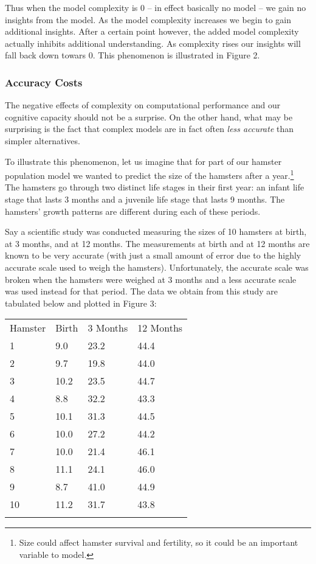 \documentclass[]{memoir}
\begin{document}
Thus when the model complexity is 0 -- in effect basically no model --
we gain no insights from the model. As the model complexity increases we
begin to gain additional insights. After a certain point however, the
added model complexity actually inhibits additional understanding. As
complexity rises our insights will fall back down towars 0. This
phenomenon is illustrated in Figure 2.

\subsubsection{Accuracy Costs}

The negative effects of complexity on computational performance and our
cognitive capacity should not be a surprise. On the other hand, what may
be surprising is the fact that complex models are in fact often
\emph{less accurate} than simpler alternatives.

To illustrate this phenomenon, let us imagine that for part of our
hamster population model we wanted to predict the size of the hamsters
after a year.\footnote{Size could affect hamster survival and fertility,
  so it could be an important variable to model.} The hamsters go
through two distinct life stages in their first year: an infant life
stage that lasts 3 months and a juvenile life stage that lasts 9 months.
The hamsters' growth patterns are different during each of these
periods.

Say a scientific study was conducted measuring the sizes of 10 hamsters
at birth, at 3 months, and at 12 months. The measurements at birth and
at 12 months are known to be very accurate (with just a small amount of
error due to the highly accurate scale used to weigh the hamsters).
Unfortunately, the accurate scale was broken when the hamsters were
weighed at 3 months and a less accurate scale was used instead for that
period. The data we obtain from this study are tabulated below and
plotted in Figure 3:

\begin{longtable}[c]{@{}llll@{}}
\hline\noalign{\medskip}
Hamster & Birth & 3 Months & 12 Months
\\\noalign{\medskip}
\hline\noalign{\medskip}
1 & 9.0 & 23.2 & 44.4
\\\noalign{\medskip}
2 & 9.7 & 19.8 & 44.0
\\\noalign{\medskip}
3 & 10.2 & 23.5 & 44.7
\\\noalign{\medskip}
4 & 8.8 & 32.2 & 43.3
\\\noalign{\medskip}
5 & 10.1 & 31.3 & 44.5
\\\noalign{\medskip}
6 & 10.0 & 27.2 & 44.2
\\\noalign{\medskip}
7 & 10.0 & 21.4 & 46.1
\\\noalign{\medskip}
8 & 11.1 & 24.1 & 46.0
\\\noalign{\medskip}
9 & 8.7 & 41.0 & 44.9
\\\noalign{\medskip}
10 & 11.2 & 31.7 & 43.8
\\\noalign{\medskip}
\hline
\end{longtable}
\end{document}
